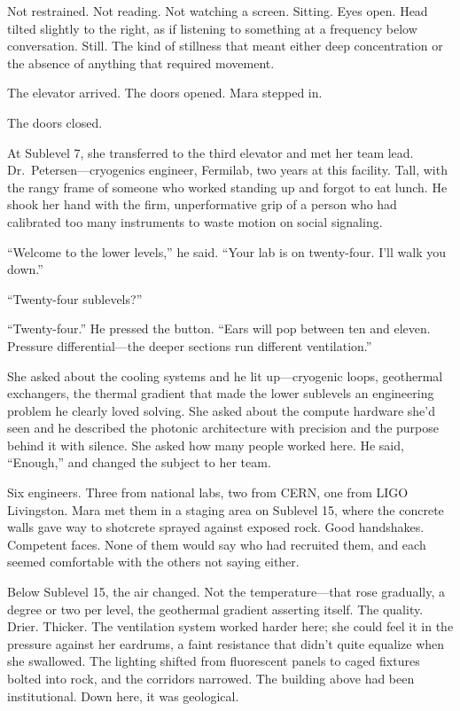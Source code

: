 Not restrained. Not reading. Not watching a screen. Sitting. Eyes open. Head tilted slightly to the right, as if listening to something at a frequency below conversation. Still. The kind of stillness that meant either deep concentration or the absence of anything that required movement.

The elevator arrived. The doors opened. Mara stepped in.

The doors closed.

At Sublevel 7, she transferred to the third elevator and met her team lead. Dr.\ Petersen---cryogenics engineer, Fermilab, two years at this facility. Tall, with the rangy frame of someone who worked standing up and forgot to eat lunch. He shook her hand with the firm, unperformative grip of a person who had calibrated too many instruments to waste motion on social signaling.

``Welcome to the lower levels,'' he said. ``Your lab is on twenty-four. I'll walk you down.''

``Twenty-four sublevels?''

``Twenty-four.'' He pressed the button. ``Ears will pop between ten and eleven. Pressure differential---the deeper sections run different ventilation.''

She asked about the cooling systems and he lit up---cryogenic loops, geothermal exchangers, the thermal gradient that made the lower sublevels an engineering problem he clearly loved solving. She asked about the compute hardware she'd seen and he described the photonic architecture with precision and the purpose behind it with silence. She asked how many people worked here. He said, ``Enough,'' and changed the subject to her team.

Six engineers. Three from national labs, two from CERN, one from LIGO Livingston. Mara met them in a staging area on Sublevel 15, where the concrete walls gave way to shotcrete sprayed against exposed rock. Good handshakes. Competent faces. None of them would say who had recruited them, and each seemed comfortable with the others not saying either.

Below Sublevel 15, the air changed. Not the temperature---that rose gradually, a degree or two per level, the geothermal gradient asserting itself. The quality. Drier. Thicker. The ventilation system worked harder here; she could feel it in the pressure against her eardrums, a faint resistance that didn't quite equalize when she swallowed. The lighting shifted from fluorescent panels to caged fixtures bolted into rock, and the corridors narrowed. The building above had been institutional. Down here, it was geological.

